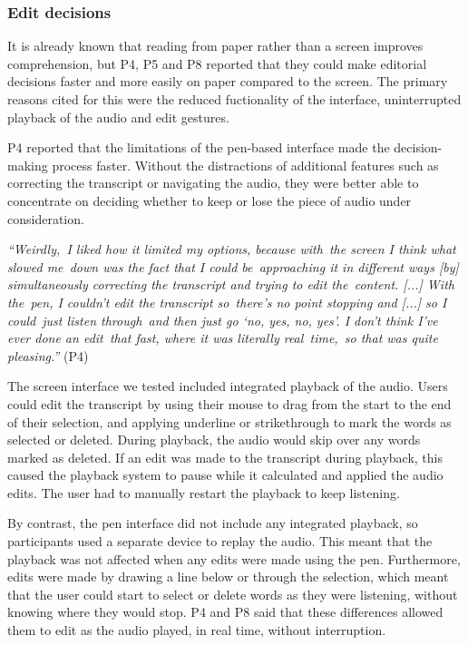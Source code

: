 \subsubsection{Edit decisions}\label{sec:paper-edit-decisions}

It is already known that reading from paper rather than a screen improves comprehension, but P4, P5 and P8 reported
that they could make editorial decisions faster and more easily on paper compared to the screen. The primary
reasons cited for this were the reduced fuctionality of the interface, uninterrupted playback of the audio and edit
gestures.

P4 reported that the limitations of the pen-based interface made the decision-making process faster. Without the
distractions of additional features such as correcting the transcript or navigating the audio, they were better able to
concentrate on deciding whether to keep or lose the piece of audio under consideration.

\textit{``Weirdly, I liked how it limited my options, because with the screen I think what slowed me down
  was the fact that I could be approaching it in different ways [by]
  simultaneously correcting the transcript and trying to edit the content. [...]
  With the pen, I couldn't edit the transcript so there's no point stopping and [...]
  so I could just listen through and then just go `no, yes, no, yes'.
  I don't think I've ever done an edit that fast, where it was literally real time, so that was quite pleasing.''} (P4)

The screen interface we tested included integrated playback of the audio. Users could edit the transcript by using
their mouse to drag from the start to the end of their selection, and applying underline or strikethrough to mark the
words as selected or deleted. During playback, the audio would skip over any words marked as deleted.  If an edit was
made to the transcript during playback, this caused the playback system to pause while it calculated and applied the
audio edits.  The user had to manually restart the playback to keep listening.

By contrast, the pen interface did not include any integrated playback, so participants used a separate device to
replay the audio. This meant that the playback was not affected when any edits were made using the pen. Furthermore,
edits were made by drawing a line below or through the selection, which meant that the user could start to select or
delete words as they were listening, without knowing where they would stop.  P4 and P8 said that these differences
allowed them to edit as the audio played, in real time, without interruption.

